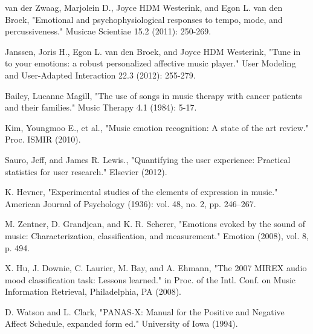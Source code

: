 \documentclass[10pt,journal,compsoc]{IEEEtran}
\begin{document}
%
%
%
\begin{thebibliography}{30}
  
  van der Zwaag, Marjolein D., Joyce HDM Westerink, and Egon L. van den Broek, "Emotional and psychophysiological responses to tempo, mode, and percussiveness." Musicae Scientiae 15.2 (2011): 250-269.
  
  Janssen, Joris H., Egon L. van den Broek, and Joyce HDM Westerink, "Tune in to your emotions: a robust personalized affective music player." User Modeling and User-Adapted Interaction 22.3 (2012): 255-279.
  
  Bailey, Lucanne Magill, "The use of songs in music therapy with cancer patients and their families." Music Therapy 4.1 (1984): 5-17.
  
  Kim, Youngmoo E., et al., "Music emotion recognition: A state of the art review." Proc. ISMIR (2010).
  
  Sauro, Jeff, and James R. Lewis., "Quantifying the user experience: Practical statistics for user research." Elsevier (2012).

  K. Hevner, "Experimental studies of the elements of expression in music." American Journal of Psychology (1936): vol. 48, no. 2, pp. 246–267.
     
  M. Zentner, D. Grandjean, and K. R. Scherer, "Emotions evoked by the sound of music: Characterization, classification, and measurement." Emotion (2008), vol. 8, p. 494.
   
   X. Hu, J. Downie, C. Laurier, M. Bay, and A. Ehmann, "The 2007 MIREX audio mood classification task: Lessons learned." in Proc. of the Intl. Conf. on Music Information Retrieval, Philadelphia, PA (2008).
    
  D. Watson and L. Clark, "PANAS-X: Manual for the Positive and Negative Affect Schedule, expanded form ed." University of Iowa (1994).
  

\end{thebibliography}
\end{document}
